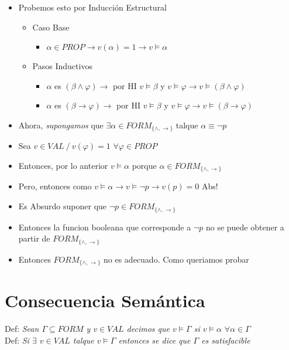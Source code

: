 \documentclass[14pt,a4paper,fleqn]{article}
\newcommand{\implica}[2]{(#1 \rightarrow #2)}
\newcommand{\entonces}{\rightarrow}
\newcommand{\satisface}{\vDash}
\newcommand{\conj}[2]{(#1 \wedge #2)}
\begin{document}
\begin{enumerate}
\begin{itemize}
		\item Probemos esto por Inducción Estructural
		\begin{itemize}
			\item Caso Base
			\begin{itemize}
				\item $\alpha \in PROP \entonces v(\alpha) = 1 \entonces v \satisface \alpha$			
			\end{itemize}
			\item Pasos Inductivos
			\begin{itemize}
				\item $\alpha$ es $\conj \beta \varphi \entonces $ por HI $v \satisface \beta $ y $ v \satisface \varphi \entonces v \satisface \conj \beta \varphi$
				\item $\alpha$ es $\implica \beta \varphi \entonces$ por HI $v \satisface \beta $ y $v \satisface \varphi \entonces v \satisface \implica \beta \varphi$
			\end{itemize}
		\end{itemize}
		\item Ahora, \emph{supongamos} que $\exists \alpha \in FORM_{\{\wedge, \entonces\}}$ talque $ \alpha \equiv \neg p$
		\item Sea $v \in VAL \: / \: v(\varphi) = 1$ $\forall \varphi \in PROP$
		\item Entonces, por lo anterior $v \satisface \alpha$ porque $\alpha \in FORM_{\{\wedge, \entonces\}}$
		\item Pero, entonces como $ v \satisface \alpha \entonces v \satisface \neg p \entonces v(p) = 0$ Abs!
		\item Es Absurdo suponer que $\neg p \in FORM_{\{\wedge, \entonces\}}$
		\item Entonces la funcion booleana que corresponde a $\neg p$ no se puede obtener a partir de $FORM_{\{\wedge, \entonces\}}$ 
		\item Entonces $FORM_{\{\wedge, \entonces\}}$ no es adecuado. Como queriamos probar
	\end{itemize}
\end{enumerate}

\section*{Consecuencia Semántica}
Def: \emph{Sean $\Gamma \subseteq FORM $ y $v \in VAL$ decimos que $v \satisface \Gamma$ si $v \satisface \alpha$ $\forall \alpha \in \Gamma $} \\
Def: \emph{Si $\exists$ $v \in VAL$ talque $v \satisface \Gamma$ entonces se dice que $\Gamma$ es satisfacible}
\end{document}
